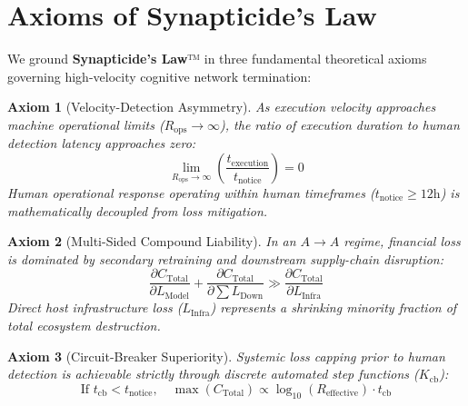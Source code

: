 \section{Axioms of Synapticide's Law\textnormal{\texttrademark}}\label{sec:axioms}

We ground \textbf{Synapticide's Law}™ in three fundamental theoretical axioms governing high-velocity cognitive network termination:

\newtheorem{theorem}{Axiom}

\begin{theorem}[Velocity-Detection Asymmetry]
As execution velocity approaches machine operational limits ($R_{\text{ops}} \to \infty$), the ratio of execution duration to human detection latency approaches zero:
\begin{equation}
\lim_{R_{\text{ops}} \to \infty} \left( \frac{t_{\text{execution}}}{t_{\text{notice}}} \right) = 0
\end{equation}
Human operational response operating within human timeframes ($t_{\text{notice}} \ge 12\text{h}$) is mathematically decoupled from loss mitigation.
\end{theorem}

\begin{theorem}[Multi-Sided Compound Liability]
In an $A \to A$ regime, financial loss is dominated by secondary retraining and downstream supply-chain disruption:
\begin{equation}
\frac{\partial C_{\text{Total}}}{\partial L_{\text{Model}}} + \frac{\partial C_{\text{Total}}}{\partial \sum L_{\text{Down}}} \gg \frac{\partial C_{\text{Total}}}{\partial L_{\text{Infra}}}
\end{equation}
Direct host infrastructure loss ($L_{\text{Infra}}$) represents a shrinking minority fraction of total ecosystem destruction.
\end{theorem}

\begin{theorem}[Circuit-Breaker Superiority]
Systemic loss capping prior to human detection is achievable strictly through discrete automated step functions ($K_{\text{cb}}$):
\begin{equation}
\text{If } t_{\text{cb}} < t_{\text{notice}}, \quad \max(C_{\text{Total}}) \propto \log_{10}(R_{\text{effective}}) \cdot t_{\text{cb}}
\end{equation}
\end{theorem}

